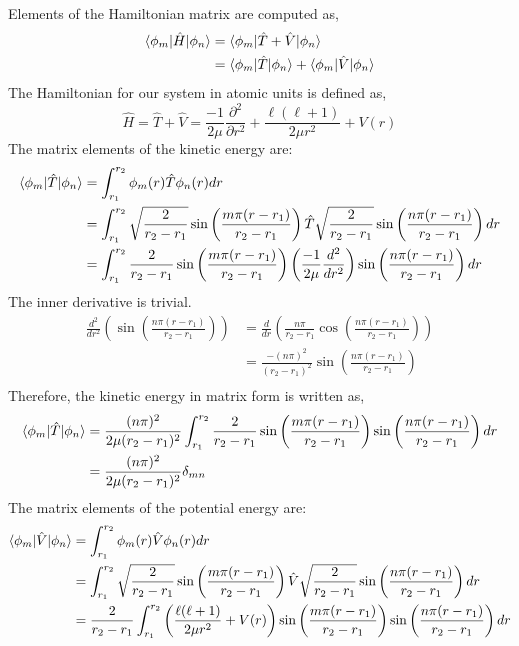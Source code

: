 \documentclass[12pt]{article}
\newcommand{\be}{\begin{equation}}
\newcommand{\ee}{\end{equation}}
\begin{document}
Elements of the Hamiltonian matrix are computed as,
\be
\begin{split}
    \braket{\phi_m|\hat{H}|\phi_n} &= \braket{\phi_m|\hat{T} + \hat{V}|\phi_n}\\
    &= \braket{\phi_m|\hat{T}|\phi_n} + \braket{\phi_m|\hat{V}|\phi_n} \\
\end{split}
\ee
The Hamiltonian for our system in atomic units is defined as,
\be
    \hat{H} = \hat{T} + \hat{V} = \frac{-1}{2\mu} \frac{\partial^2}{\partial r^2} + \frac{\ell(\ell+1)}{2\mu r^2} + V(r)
\ee
The matrix elements of the kinetic energy are:
\be
\begin{split}
    \braket{\phi_m|\hat{T}|\phi_n} &= \int_{r_1}^{r_2} \phi_m(r) \hat{T} \phi_n(r) dr \\
    &= \int_{r_1}^{r_2} \sqrt{\frac{2}{r_2 - r_1}} \sin \left( \frac{m \pi (r - r_1)}{r_2 - r_1} \right) \hat{T} \sqrt{\frac{2}{r_2 - r_1}} \sin \left( \frac{n \pi (r - r_1)}{r_2 - r_1} \right) dr \\
    &= \int_{r_1}^{r_2} \frac{2}{r_2 - r_1} \sin \left( \frac{m \pi (r - r_1)}{r_2 - r_1} \right) \left( \frac{-1}{2 \mu} \frac{d^2}{dr^2} \right) \sin \left( \frac{n \pi (r - r_1)}{r_2 - r_1} \right) dr \\
\end{split}
\ee
The inner derivative is trivial.
\be
\begin{split}
    \frac{d^2}{dr^2} \left( \sin \left( \frac{n \pi (r - r_1)}{r_2 - r_1} \right) \right) &= \frac{d}{dr} \left( \frac{n \pi}{r_2 - r_1} \cos \left( \frac{n \pi (r - r_1)}{r_2 - r_1} \right) \right)\\
    &= \frac{-(n \pi)^2}{(r_2 - r_1)^2} \sin \left( \frac{n \pi (r - r_1)}{r_2 - r_1} \right) \\
\end{split}
\ee
Therefore, the kinetic energy in matrix form is written as,
\be
\begin{split}
    \braket{\phi_m|\hat{T}|\phi_n} &= \frac{(n\pi)^2}{2 \mu(r_2 - r_1)^2} \int_{r_1}^{r_2} \frac{2}{r_2 - r_1} \sin \left( \frac{m \pi (r - r_1)}{r_2 - r_1} \right) \sin \left( \frac{n \pi (r - r_1)}{r_2 - r_1} \right) dr \\
    &= \frac{(n \pi)^2}{2 \mu (r_2 - r_1)^2} \delta_{mn}\\
\end{split}
\ee
The matrix elements of the potential energy are:
\be
\begin{split}
    \braket{\phi_m|\hat{V}|\phi_n} &= \int_{r_1}^{r_2} \phi_m(r) \hat{V} \phi_n(r) dr \\
    &= \int_{r_1}^{r_2} \sqrt{\frac{2}{r_2 - r_1}} \sin \left( \frac{m \pi (r - r_1)}{r_2 - r_1} \right) \hat{V} \sqrt{\frac{2}{r_2 - r_1}} \sin \left( \frac{n \pi (r - r_1)}{r_2 - r_1} \right) dr \\
    &= \frac{2}{r_2 - r_1} \int_{r_1}^{r_2} \left( \frac{\ell(\ell+1)}{2\mu r^2} + V(r) \right) \sin \left( \frac{m \pi (r - r_1)}{r_2 - r_1} \right) \sin \left( \frac{n \pi (r - r_1)}{r_2 - r_1} \right) dr \\
\end{split}
\ee
\end{document}
